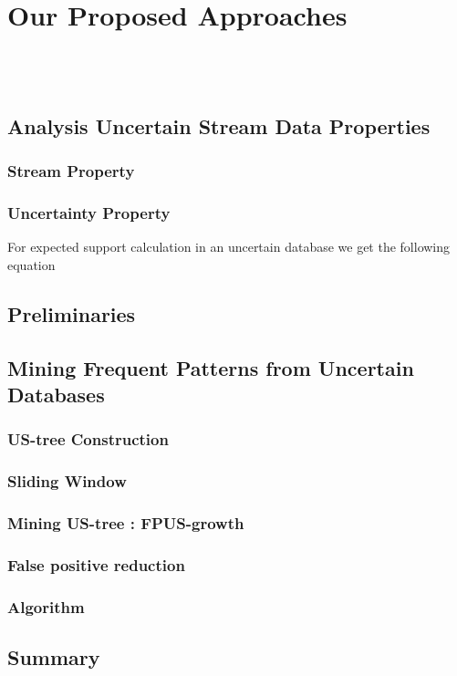 \documentclass[a4paper,12pt]{book}
\begin{document}
\tableofcontents
\chapter{Our Proposed Approaches}

\\ \\


\section{Analysis Uncertain Stream Data Properties}
\subsection{Stream Property}
\subsection{Uncertainty Property}
\noindent
For expected support calculation in an uncertain database we get the following equation\\

\section{Preliminaries}

\section{Mining Frequent Patterns from Uncertain Databases}
\subsection{US-tree Construction}
\subsection{Sliding Window}
\subsection{Mining US-tree : FPUS-growth}
\subsection{False positive reduction}
\subsection{Algorithm}
\section{Summary}



\end{document}
